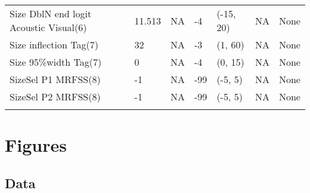 \documentclass[11pt,
  english,
  letterpaper,
]{article}
\begin{document}
\begin{landscape}
\begin{longtable}[t]{>{\raggedright\arraybackslash}p{7.5cm}lllll>{\raggedright\arraybackslash}p{3.5cm}}
Size DblN end logit Acoustic Visual(6) & 11.513 & NA & -4 & (-15, 20) & NA & None\\
Size inflection Tag(7) & 32 & NA & -3 & (1, 60) & NA & None\\
Size 95\%width Tag(7) & 0 & NA & -4 & (0, 15) & NA & None\\
SizeSel P1 MRFSS(8) & -1 & NA & -99 & (-5, 5) & NA & None\\
SizeSel P2 MRFSS(8) & -1 & NA & -99 & (-5, 5) & NA & None\\*
\end{longtable}
\endgroup{}
\end{landscape}
\endgroup{}

\newpage





\newpage



\newpage



\newpage

















\newpage



\clearpage

\clearpage


\hypertarget{figures}{%
\section{Figures}\label{figures}}

\hypertarget{data}{%
\subsection{Data}\label{data}}
\end{document}

